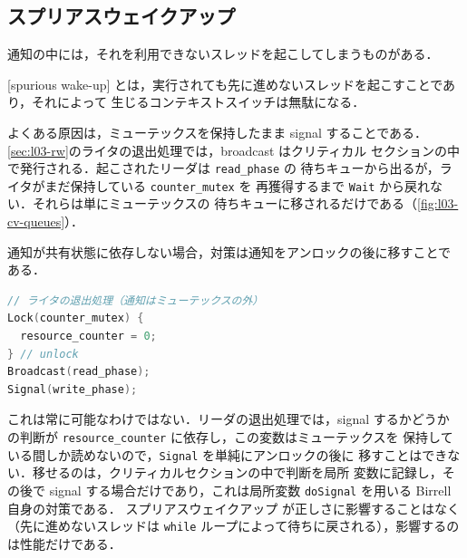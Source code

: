 \documentclass[../main.tex]{subfiles}
\begin{document}
\subsection{スプリアスウェイクアップ}

通知の中には，それを利用できないスレッドを起こしてしまうものがある．

\begin{definition}[スプリアスウェイクアップ]
  [spurious wake-up]%
  とは，実行されても先に進めないスレッドを起こすことであり，それによって
  生じるコンテキストスイッチは無駄になる．
\end{definition}

よくある原因は，ミューテックスを保持したまま signal することである．%
\cref{sec:l03-rw}のライタの退出処理では，broadcast はクリティカル
セクションの中で発行される．起こされたリーダは \texttt{read\_phase} の
待ちキューから出るが，ライタがまだ保持している \texttt{counter\_mutex} を
再獲得するまで \texttt{Wait} から戻れない．それらは単にミューテックスの
待ちキューに移されるだけである（\cref{fig:l03-cv-queues}）．

通知が共有状態に依存しない場合，対策は通知をアンロックの後に移すことで
ある．
\begin{lstlisting}[language=C, numbers=none]
// ライタの退出処理（通知はミューテックスの外）
Lock(counter_mutex) {
  resource_counter = 0;
} // unlock
Broadcast(read_phase);
Signal(write_phase);
\end{lstlisting}

これは常に可能なわけではない．リーダの退出処理では，signal するかどうか
の判断が \texttt{resource\_counter} に依存し，この変数はミューテックスを
保持している間しか読めないので，\texttt{Signal} を単純にアンロックの後に
移すことはできない．移せるのは，クリティカルセクションの中で判断を局所
変数に記録し，その後で signal する場合だけであり，これは局所変数
\texttt{doSignal} を用いる Birrell 自身の対策である．%
スプリアスウェイクアップ
が正しさに影響することはなく（先に進めないスレッドは \texttt{while}
ループによって待ちに戻される），影響するのは性能だけである．
\end{document}
